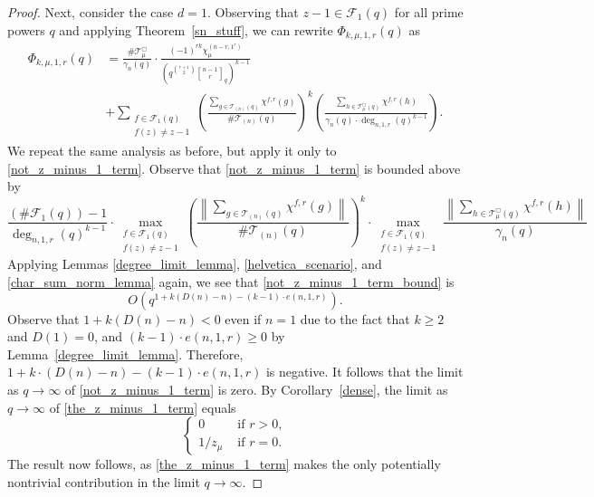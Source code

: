 \documentclass[10pt]{article}
\theoremstyle{definition}
\newcommand{\CF}{\mathcal{F}}
\newcommand{\CT}{\mathcal{T}}
\begin{document}
\begin{proof}
Next, consider the case \(d = 1\).
Observing that \(z-1 \in \CF_1 (q)\) for all prime powers \(q\) and applying Theorem~\ref{sn_stuff}, we can rewrite \(\Phi_{k,\mu,1,r} (q)\) as
\begin{align}
\Phi_{k,\mu,1,r} (q)
& =
\frac{\# \CT_\mu^\Box}{\gamma_n (q)}
\cdot
\frac{(-1)^{rk} \chi^{(n-r,1^r)}_\mu}{\left ( q^{\binom{r+1}{2}} {\genfrac[]{0pt}{1}{n - 1}{r}}_{q} \right )^{k-1}}
\label{the_z_minus_1_term}
\\
& + \label{not_z_minus_1_term}
\sum_{\substack{f \in \CF_1 (q) \\ f(z) \neq z-1}}
\left (
\frac{\sum_{g \in \CT_{(n)}(q)} \chi^{f,r}(g)}{\# \CT_{(n)}(q)}
\right )^k
\left (
\frac{\sum_{h \in \CT^\Box_\mu(q)} \chi^{f,r}(h)}{\gamma_n(q) \cdot \deg_{n,1,r}(q)^{k-1}}
\right ).
\end{align}
We repeat the same analysis as before, but apply it only to \eqref{not_z_minus_1_term}.
Observe that \eqref{not_z_minus_1_term} is bounded above by
\begin{equation}
\label{not_z_minus_1_term_bound}
\frac{
(\# \CF_1(q)) - 1
}{
\deg_{n,1,r} (q)^{k-1}
}
\cdot
\max_{\substack{f \in \CF_1 (q) \\ f(z) \neq z-1}}
\left (
\frac{\left \| \sum_{g \in \CT_{(n)}(q)} \chi^{f,r}(g) \right \|}{\# \CT_{(n)}(q)}
\right )^k
\cdot
\max_{\substack{f \in \CF_1 (q) \\ f(z) \neq z-1}}
\frac{\left \| \sum_{h \in \CT^\Box_\mu(q)} \chi^{f,r}(h) \right \|}{\gamma_n(q)}
\end{equation}
Applying Lemmas \ref{degree_limit_lemma}, \ref{helvetica_scenario}, and \ref{char_sum_norm_lemma} again, we see that \eqref{not_z_minus_1_term_bound} is
\begin{equation}
\label{d_1_non_z_minus_1}
O \left (
q^{1 + k (D(n) - n) - (k-1) \cdot e(n,1,r)}
\right ).
\end{equation}
Observe that \(1 + k(D(n) - n) < 0\) even if \(n = 1\) due to the fact that \(k \geq 2\) and \(D(1)=0\), and \((k-1) \cdot e(n,1,r) \geq 0\) by Lemma~\ref{degree_limit_lemma}.
Therefore, \(1 + k \cdot (D(n) - n) - (k-1) \cdot e(n,1,r)\) is negative.
It follows that the limit as \(q \to \infty\) of \eqref{not_z_minus_1_term} is zero.
By Corollary~\ref{dense}, the limit as \(q \to \infty\) of \eqref{the_z_minus_1_term} equals
\begin{equation}
\begin{cases}
0 & \text{ if } r > 0, \\
1/z_\mu & \text{ if } r = 0.
\end{cases}
\end{equation}
The result now follows, as \eqref{the_z_minus_1_term} makes the only potentially nontrivial contribution in the limit \(q \to \infty\).
\end{proof}
\end{document}
